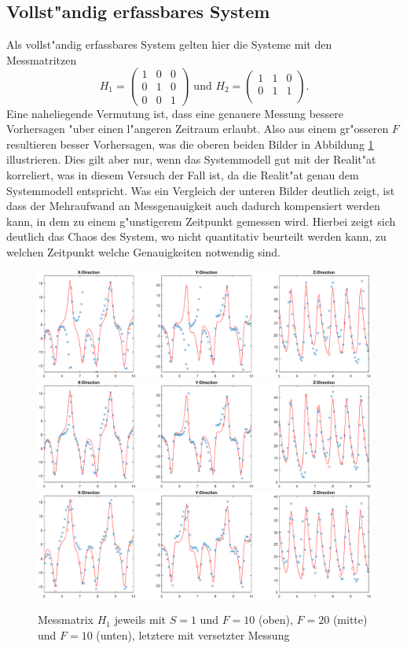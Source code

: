 \begin{refsection}
\subsection{Vollst"andig erfassbares System}
Als vollst"andig erfassbares System gelten hier die Systeme mit den Messmatritzen
\[
H_{1}=\begin{pmatrix}
1 & 0 & 0 \\ 
0 & 1 & 0 \\ 
0 & 0 & 1
\end{pmatrix} 
\text{ und }
H_{2}=\begin{pmatrix}
1 & 1 & 0 \\ 
0 & 1 & 1 \\ 
\end{pmatrix}
\text{.}
\]
Eine naheliegende Vermutung ist, dass eine genauere Messung bessere Vorhersagen "uber einen l"angeren Zeitraum erlaubt. Also aus einem gr"osseren $F$ resultieren besser Vorhersagen, was die oberen beiden Bilder in Abbildung \ref{kalman:H1S1} illustrieren. Dies gilt aber nur, wenn das Systemmodell gut mit der Realit"at korreliert, was in diesem Versuch der Fall ist, da die Realit"at genau dem Systemmodell entspricht.
Was ein Vergleich der unteren Bilder deutlich zeigt, ist dass der Mehraufwand an Messgenauigkeit auch dadurch kompensiert werden kann, in dem zu einem g"unstigerem Zeitpunkt gemessen wird. Hierbei zeigt sich deutlich das Chaos des System, wo nicht quantitativ beurteilt werden kann, zu welchen Zeitpunkt welche Genauigkeiten notwendig sind.
\begin{figure}
\centering
\includegraphics[width=\hsize]{kalman/figures/H1R10S1.pdf}
\includegraphics[width=\hsize]{kalman/figures/H1R20S1.pdf}
\includegraphics[width=\hsize]{kalman/figures/H1R10S1aS.pdf}
\caption{Messmatrix $H_{1}$ jeweils mit $S=1$ und $F=10$ (oben), $F=20$ (mitte) und $F=10$ (unten), letztere mit versetzter Messung}
\label{kalman:H1S1}
\end{figure}


\end{refsection}
